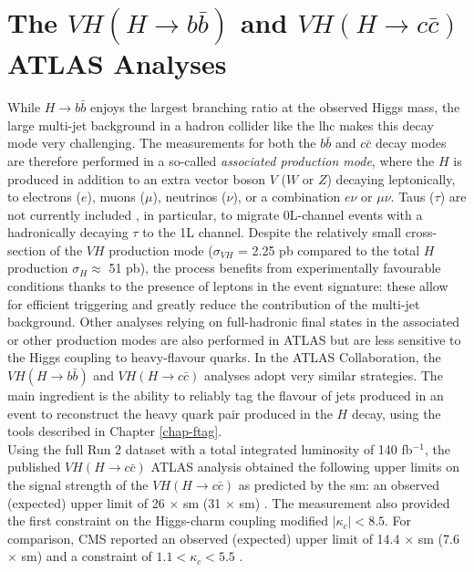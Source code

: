 \section{The $VH (H \rightarrow b\bar{b})$ and $VH (H \rightarrow c\bar{c})$ ATLAS Analyses}
While $H \rightarrow b\bar{b}$ enjoys the largest branching ratio at the observed Higgs mass, the large multi-jet background in a hadron collider like the \gls{lhc} makes this decay mode very challenging. The measurements for both the $b\bar{b}$ and $c\bar{c}$ decay modes are therefore performed in a so-called \textit{associated production mode}, where the $H$ is produced in addition to an extra vector boson $V$ ($W$ or $Z$) decaying leptonically, to electrons ($e$), muons ($\mu$), neutrinos ($\nu$), or a combination $e\nu$ or $\mu\nu$. Taus ($\tau$) are not currently included , in particular, to migrate 0L-channel events with a hadronically decaying $\tau$ to the 1L channel. Despite the relatively small cross-section of the $VH$ production mode ($\sigma_{VH}$ = 2.25 pb compared to the total $H$ production $\sigma_H \approx$ 51 pb), the process benefits from experimentally favourable conditions thanks to the presence of leptons in the event signature: these allow for efficient triggering and greatly reduce the contribution of the multi-jet background. Other analyses relying on full-hadronic final states in the associated or other production modes are also performed in ATLAS but are less sensitive to the Higgs coupling to heavy-flavour quarks. In the ATLAS Collaboration, the $VH (H\rightarrow b\bar{b})$ and $VH (H\rightarrow c\bar{c})$ analyses adopt very similar strategies. The main ingredient is the ability to reliably tag the flavour of jets produced in an event to reconstruct the heavy quark pair produced in the $H$ decay, using the tools described in Chapter \ref{chap-ftag}. \\ %

Using the full Run 2 dataset with a total integrated luminosity of 140 fb$^{-1}$, the published $VH (H\rightarrow c\bar{c})$ ATLAS analysis obtained the following upper limits on the signal strength of the $VH (H\rightarrow c\bar{c})$ as predicted by the \gls{sm}: an observed (expected) upper limit of 26 $\times$ \gls{sm} (31 $\times$ \gls{sm}) \cite{Collaboration:2721696}. The measurement also provided the first constraint on the Higgs-charm coupling modified $|\kappa_c| < 8.5$. For comparison, CMS reported an observed (expected) upper limit of 14.4 $\times$ \gls{sm} (7.6 $\times$ \gls{sm}) and a constraint of $1.1 < \kappa_c < 5.5$ \cite{arXiv:2205.05550}. \\  %

